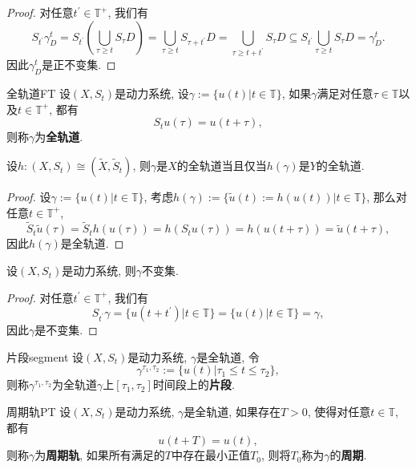 \begin{proof}
	对任意$t^{\prime}\in\mathbb{T}^{+}$, 我们有$$S_{t^{\prime}}\gamma_{D}^{t}=S_{t^{\prime}}\left(\bigcup_{\tau\geqslant t}S_{\tau}D\right)=\bigcup_{\tau\geqslant t}S_{\tau+t^{\prime}}D=\bigcup_{\tau\geqslant t+t^{\prime}}S_{\tau}D\subseteq S_{t^{\prime}}\bigcup_{\tau\geqslant t}S_{\tau}D=\gamma_{D}^{t}.$$因此$\gamma_{D}^{t}$是正不变集. 
\end{proof}

\begin{definition}{全轨道}{FT}\index[symbol]{$\gamma$}
	设$(X,S_{t})$是动力系统, 设$\gamma:=\{u(t)|t\in\mathbb{T}\}$, 如果$\gamma$满足对任意$\tau\in\mathbb{T}$以及$t\in\mathbb{T}^{+}$, 都有$$S_{t}u(\tau)=u(t+\tau),$$则称$\gamma$为\textbf{全轨道}. 
\end{definition}

\begin{exercise}
	设$h:(X,S_{t})\cong(\tilde{X},\tilde{S}_{t})$, 则$\gamma$是$X$的全轨道当且仅当$h(\gamma)$是$Y$的全轨道.
\end{exercise}

\begin{proof}
	设$\gamma:=\{u(t)|t\in\mathbb{T}\}$, 考虑$h(\gamma):=\{\tilde{u}(t):=h(u(t))|t\in\mathbb{T}\}$, 那么对任意$t\in\mathbb{T}^{+}$, $$\tilde{S}_{t}\tilde{u}(\tau)=\tilde{S}_{t}h(u(\tau))=h(S_{t}u(\tau))=h(u(t+\tau))=\tilde{u}(t+\tau),$$因此$h(\gamma)$是全轨道.
\end{proof}

\begin{exercise}
	设$(X,S_{t})$是动力系统, 则$\gamma$不变集.
\end{exercise}

\begin{proof}
	对任意$t^{\prime}\in\mathbb{T}^{+}$, 我们有$$S_{t^{\prime}}\gamma=\{u(t+t^{\prime})|t\in\mathbb{T}\}=\{u(t)|t\in\mathbb{T}\}=\gamma,$$因此$\gamma$是不变集. 
\end{proof}

\begin{definition}{片段}{segment}
	设$(X,S_{t})$是动力系统, $\gamma$是全轨道, 令$$\gamma^{\tau_{1},\tau_{2}}:=\{u(t)|\tau_{1}\leqslant t\leqslant \tau_{2}\},$$则称$\gamma^{\tau_{1},\tau_{2}}$为全轨道$\gamma$上$[\tau_{1},\tau_{2}]$时间段上的\textbf{片段}. 
\end{definition}

\begin{definition}{周期轨}{PT}
	设$(X,S_{t})$是动力系统, $\gamma$是全轨道, 如果存在$T>0$, 使得对任意$t\in\mathbb{T}$, 都有
	\begin{equation}\label{equ:PT}
		u(t+T)=u(t),
	\end{equation}则称$\gamma$为\textbf{周期轨},  如果所有满足的$T$中存在最小正值$T_{0}$, 则将$T_{0}$称为$\gamma$的\textbf{周期}.
\end{definition}

